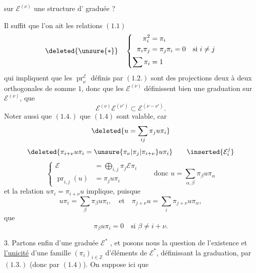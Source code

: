 sur $\mathcal E^{(\nu)}$ une structure d' graduée ?

Il suffit que l'on ait les relations $(1.1)$
\[
\deleted{\unsure{*}}\quad\left\{\begin{aligned}
\pi_i^2&=\pi_i\\
\pi_i\pi_j&=\pi_j\pi_i=0\quad\text{si }i\neq j\\
\sum\pi_i&=1
\end{aligned}\right.
\]
qui impliquent que les $\operatorname{pr}_{\nu}^{\mathcal E}$ définis par $(1.2.)$ sont des projections deux à deux orthogonales de somme $1$, donc que les $\mathcal E^{(\nu)}$ définissent bien une graduation  sur $\mathcal E^{(\nu)}$,  que
\[
\mathcal E^{(\nu)}\mathcal E^{(\nu')}\subset\mathcal E^{(\nu-\nu')}.
\]
Noter aussi que $(1.4.)$ que $(1.4)$ sont valable, car 
\[
\deleted{u=\sum_{ij}\pi_j u\pi_i}
\]
\[
\deleted{\pi_{i+\nu}u\pi_i=\unsure{\pi_\nu|\pi_j|\pi_{i+\nu}}u\pi_i}
\qquad\inserted{\mathcal E_i^j}
\]
\[
\left\{\begin{aligned}
\mathcal E&=\bigoplus_{i,j}\pi_j\mathcal E\pi_i\\
\operatorname{pr}_{i,j}(u)&=\pi_j u\pi_i
\end{aligned}\right.
\qquad\text{donc }u=\sum_{\alpha,\beta}\pi_\beta u\pi_\alpha
\]
et la relation $u\pi_i=\pi_{i+\nu}u$ implique, puisque
\[
u\pi_i=\sum_\beta\pi_\beta u\pi_i,\quad\text{et}\quad
\pi_{j+\nu}u=\sum_i\pi_{j+\nu}u\pi_\alpha,
\]
que
\[
\pi_\beta u\pi_i=0\quad\text{si }\beta\neq i+\nu.
\]

3.  Partons enfin d'une  graduée $\mathcal E^*$ , et posons nous la question de l'existence et \uline{l'unicité} d'une famille $(\pi_i)_{i\in\mathbb Z}$ d'éléments de $\mathcal E^*$,  définissant la graduation, par $(1.3.)$ (donc par $(1.4)$). On  suppose ici que
